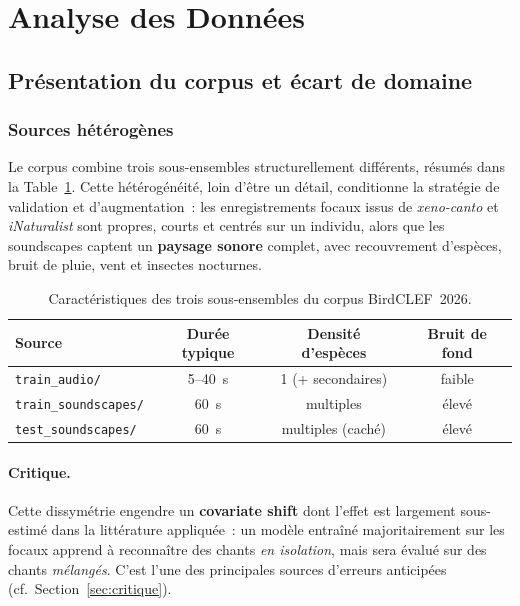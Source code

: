 \section{Analyse des Données}
\label{sec:donnees}

\subsection{Présentation du corpus et écart de domaine}

\subsubsection{Sources hétérogènes}
Le corpus combine trois sous-ensembles structurellement différents,
résumés dans la Table~\ref{tab:corpus}. Cette hétérogénéité, loin d'être
un détail, conditionne la stratégie de validation et d'augmentation~:
les enregistrements focaux issus de \textit{xeno-canto} et
\textit{iNaturalist} sont propres, courts et centrés sur un individu, alors
que les soundscapes captent un \textbf{paysage sonore} complet, avec
recouvrement d'espèces, bruit de pluie, vent et insectes nocturnes.

\begin{table}[h]
    \centering
    \small
    \begin{tabular}{lccc}
        \hline
        \textbf{Source}              & \textbf{Durée typique} & \textbf{Densité d'espèces} &
        \textbf{Bruit de fond}                                                                      \\
        \hline
        \texttt{train\_audio/}       & 5--40~s                & 1 (+ secondaires)          & faible \\
        \texttt{train\_soundscapes/} & 60~s                   & multiples                  & élevé  \\
        \texttt{test\_soundscapes/}  & 60~s                   & multiples (caché)          & élevé  \\
        \hline
    \end{tabular}
    \caption{Caractéristiques des trois sous-ensembles du corpus BirdCLEF~2026.}
    \label{tab:corpus}
\end{table}

\paragraph{Critique.} Cette dissymétrie engendre un \textbf{covariate shift}
dont l'effet est largement sous-estimé dans la littérature appliquée~: un
modèle entraîné majoritairement sur les focaux apprend à reconnaître des
chants \textit{en isolation}, mais sera évalué sur des chants
\textit{mélangés}. C'est l'une des principales sources d'erreurs anticipées
(cf.~Section~\ref{sec:critique}).

